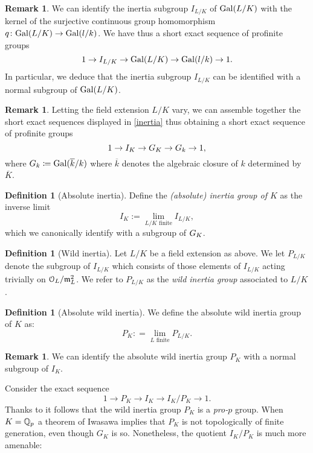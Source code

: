 \documentclass[10pt,a4paper]{amsart}
\numberwithin{equation}{subsection}
\theoremstyle{plain}
\theoremstyle{definition}
\newtheorem{defi}[theorem]{Definition}
\newtheorem{rema}[theorem]{Remark}
\theoremstyle{remark}
\numberwithin{equation}{section}
\begin{document}
\begin{rema}
We can identify the inertia subgroup $ I_{L/K}$ of $\mathrm{Gal}( L / K )$ with the kernel of the surjective continuous group homomorphism $q \colon \mathrm{Gal}( L / K ) \to \mathrm{Gal}( l/ k)$. We have thus a short exact sequence of profinite groups
	\begin{equation} \label{inertia}
		1 \to I_{L/K} \to \mathrm{Gal}( L / K ) \to \mathrm{Gal}( l/ k) \to 1.
	\end{equation}
In particular,
we deduce that the inertia subgroup $I_{L / K }$ can be identified with a normal subgroup of $\mathrm{Gal}( L / K)$.
\end{rema}

\begin{rema}
Letting the field extension $L/K$ vary, we can assemble
together the short exact sequences displayed in \eqref{inertia} thus obtaining a short exact sequence of profinite groups
	\begin{equation} \label{absinert}
		1 \to I_K \to G_K \to G_k \to 1,
	\end{equation}
where $G_k \coloneqq \mathrm{Gal}( \overline{k}/ k)$ where $\overline{k}$ denotes the algebraic closure of $k$ determined by $ \overline{K}$.
\end{rema}

\begin{defi}[Absolute inertia]
Define the \emph{(absolute) inertia group of $K$} as the inverse limit
	\[
		I_K := \lim_{L/K \text{ finite}} I_{L/ K},
	\]
which we canonically identify with a subgroup of $G_K$.
\end{defi}

\begin{defi}[Wild inertia]
Let $L/ K$ be a field extension as above. We let $P_{L/K}$ denote the subgroup of $I_{L/K}$ which
consists of those elements of $I_{L/K}$ acting trivially on $\mathcal{O}_L/ \mathfrak{m}^2_L$. We refer to $P_{L/K}$ as the \emph{wild inertia group} associated to $L/K$.
\end{defi}


\begin{defi}[Absolute wild inertia]
We define the absolute wild inertia group of $K$ as:
	\[
		P_K : = \lim_{L \text{ finite}} P_{L/K}.
	\] 
\end{defi}


\begin{rema}
We can identify the absolute wild inertia group $P_K $ with a normal subgroup of $I_K$.
\end{rema}

Consider the exact sequence
	\begin{equation} \label{wild_tame}
		1 \to P_K \to I_K \to I_K / P_K \to 1.
	\end{equation}
Thanks to \cite[Lemma 53.13.6]{stacks} it follows that the wild inertia group $P_K$ is a \emph{pro-$p$} group. When $K = \mathbb{Q}_p$ a theorem of Iwasawa implies that $P_K$ is not topologically of finite generation, even though
$G_K$ is so.
Nonetheless, the quotient $I_K / P_K$ is much more amenable:
\end{document}
